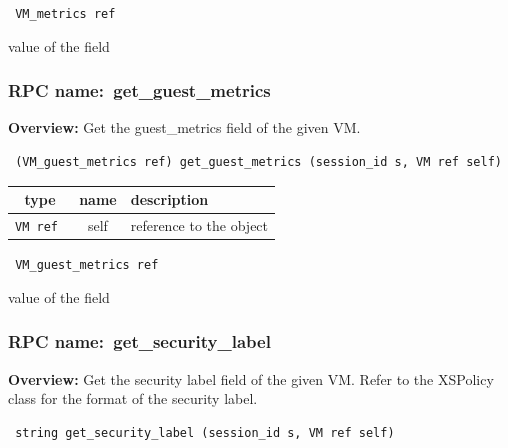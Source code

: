 \vspace{0.3cm}

{\tt 
VM\_metrics ref
}


value of the field
\vspace{0.3cm}
\vspace{0.3cm}
\vspace{0.3cm}
\subsubsection{RPC name:~get\_guest\_metrics}

{\bf Overview:} 
Get the guest\_metrics field of the given VM.

\begin{verbatim} (VM_guest_metrics ref) get_guest_metrics (session_id s, VM ref self)\end{verbatim}



 
\vspace{0.3cm}
\begin{tabular}{|c|c|p{7cm}|}
 \hline
{\bf type} & {\bf name} & {\bf description} \\ \hline
{\tt VM ref } & self & reference to the object \\ \hline 

\end{tabular}

\vspace{0.3cm}

{\tt 
VM\_guest\_metrics ref
}


value of the field
\vspace{0.3cm}
\vspace{0.3cm}
\vspace{0.3cm}
\subsubsection{RPC name:~get\_security\_label}

{\bf Overview:}
Get the security label field of the given VM. Refer to the XSPolicy class
for the format of the security label.

\begin{verbatim} string get_security_label (session_id s, VM ref self)\end{verbatim}




